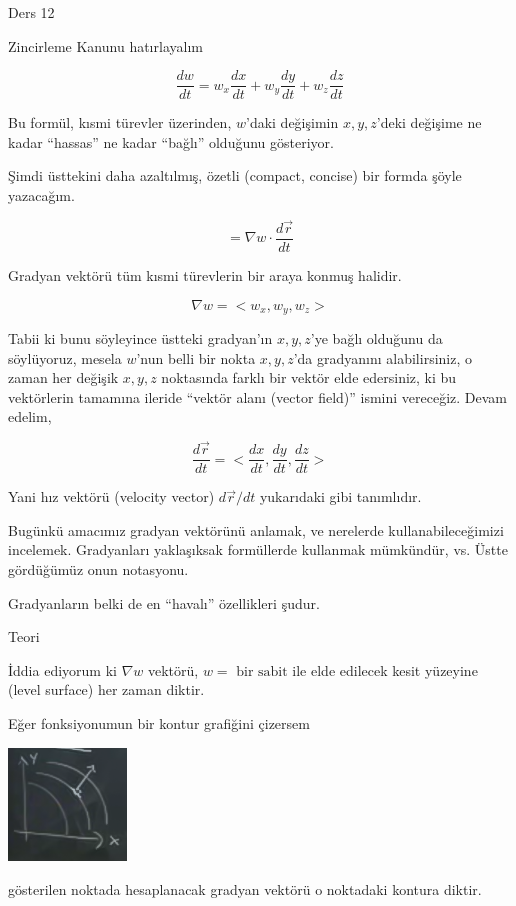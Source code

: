 \documentclass[12pt,fleqn]{article}\usepackage{../../common}
\begin{document}
Ders 12

Zincirleme Kanunu hatırlayalım

$$ \frac{dw}{dt}  = w_x \frac{dx}{dt} + 
w_y \frac{dy}{dt} + 
w_z \frac{dz}{dt}  $$

Bu formül, kısmi türevler üzerinden, $w$'daki değişimin $x,y,z$'deki
değişime ne kadar ``hassas'' ne kadar ``bağlı'' olduğunu gösteriyor.

Şimdi üsttekini daha azaltılmış, özetli (compact, concise) bir formda şöyle
yazacağım. 

$$ 
= \nabla w \cdot  \frac{d\vec{r}}{dt} 
$$

Gradyan vektörü tüm kısmi türevlerin bir araya konmuş halidir. 

$$ \nabla w = < w_x, w_y, w_z > $$

Tabii ki bunu söyleyince üstteki gradyan'ın $x,y,z$'ye bağlı olduğunu da
söylüyoruz, mesela $w$'nun belli bir nokta $x,y,z$'da gradyanını
alabilirsiniz, o zaman her değişik $x,y,z$ noktasında farklı bir vektör
elde edersiniz, ki bu vektörlerin tamamına ileride ``vektör alanı (vector
field)'' ismini vereceğiz. Devam edelim, 

$$ \frac{d\vec{r}}{dt} = < \frac{dx}{dt}, \frac{dy}{dt}, \frac{dz}{dt} > $$

Yani hız vektörü (velocity vector) $d\vec{r}/{dt}$ yukarıdaki gibi
tanımlıdır.

Bugünkü amacımız gradyan vektörünü anlamak, ve nerelerde
kullanabileceğimizi incelemek. Gradyanları yaklaşıksak formüllerde
kullanmak mümkündür, vs. Üstte gördüğümüz onun notasyonu. 

Gradyanların belki de en ``havalı'' özellikleri şudur. 

Teori

İddia ediyorum ki $\nabla w$ vektörü, $w = \textrm{ bir sabit }$ile elde
edilecek kesit yüzeyine (level surface) her zaman diktir.

Eğer fonksiyonumun bir kontur grafiğini çizersem
\begin{center}
\includegraphics[height=3cm]{12_1.png}
\end{center}
gösterilen noktada hesaplanacak gradyan vektörü o noktadaki kontura
diktir. 
\end{document}
